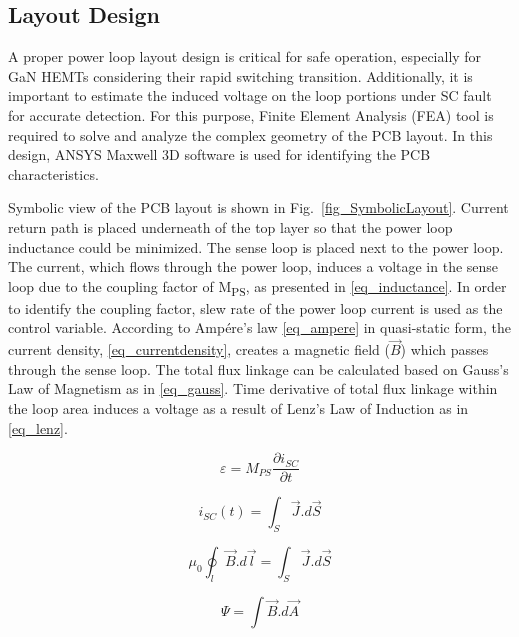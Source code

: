\documentclass[journal]{IEEEtran}
\begin{document}
\subsection{Layout Design}

A proper power loop layout design is critical for safe operation, especially for GaN HEMTs considering their rapid switching transition. Additionally, it is important to estimate the induced voltage on the loop portions under SC fault for accurate detection. For this purpose, Finite Element Analysis (FEA) tool is required to solve and analyze the complex geometry of the PCB layout. In this design, ANSYS Maxwell 3D software is used for identifying the PCB characteristics.

Symbolic view of the PCB layout is shown in Fig.~\ref{fig_SymbolicLayout}. Current return path is placed underneath of the top layer so that the power loop inductance could be minimized. The sense loop is placed next to the power loop. The current, which flows through the power loop, induces a voltage in the sense loop due to the coupling factor of M\textsubscript{PS}, as presented in \eqref{eq_inductance}. In order to identify the coupling factor, slew rate of the power loop current is used as the control variable. According to Amp\'ere's law \eqref{eq_ampere} in quasi-static form, the current density, \eqref{eq_currentdensity}, creates a magnetic field ($\vec{B}$) which passes through the sense loop. The total flux linkage can be calculated based on Gauss's Law of Magnetism as in \eqref{eq_gauss}. Time derivative of total flux linkage within the loop area induces a voltage as a result of Lenz's Law of Induction as in \eqref{eq_lenz}.

\begin{equation}
\label{eq_inductance}
    \varepsilon = M_{PS}\dfrac{\partial i_{SC}}{\partial t}
\end{equation}

\begin{equation}
\label{eq_currentdensity}
    i_{SC}(t) =  \int_S \vec{J}.d\vec{S}
\end{equation}

\begin{equation}
\label{eq_ampere}
    \mu_0 \oint_l \vec{B}.d\vec{l} = \int_S \vec{J}.d\vec{S}
\end{equation}

\begin{equation}
\label{eq_gauss}
    \Psi = \int \vec{B}.d\vec{A}
\end{equation}
\end{document}

